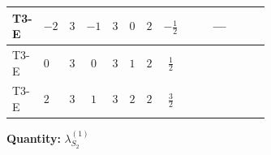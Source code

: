 \documentclass[8pt]{article}
\begin{document}
\begin{landscape}
\begin{longtable}{@{}llcccccc >{\raggedright\arraybackslash}p{0.21\linewidth} >{\raggedright\arraybackslash}p{0.21\linewidth} >{\raggedright\arraybackslash}p{0.21\linewidth}@{}}
\midrule
T3-E & $-2$ & $3$ & $-1$ & $3$ & $0$ & $2$ & $-\frac{1}{2}$ & \scriptsize\adjustbox{max width=\linewidth}{$\begin{gathered} +21 {g_2}^4\end{gathered}$} & --- & \scriptsize\adjustbox{max width=\linewidth}{$\begin{gathered} +{g_2}^2 (-24 {\lambda_{S_2}^{(1)}}-12 {\lambda_{S_2}^{(A)}})\end{gathered}$} \\
\midrule
T3-E & $0$ & $3$ & $0$ & $3$ & $1$ & $2$ & $\frac{1}{2}$ & \scriptsize\adjustbox{max width=\linewidth}{$\begin{gathered} +21 {g_2}^4\end{gathered}$} & \scriptsize\adjustbox{max width=\linewidth}{$\begin{gathered} +{g_1}^2 \left(12 {g_2}^2-12 {\lambda_{S_2}^{(1)}}-6 {\lambda_{S_2}^{(A)}}\right)\end{gathered}$} & \scriptsize\adjustbox{max width=\linewidth}{$\begin{gathered} +{g_2}^2 (-24 {\lambda_{S_2}^{(1)}}-12 {\lambda_{S_2}^{(A)}})\end{gathered}$} \\
\midrule
T3-E & $2$ & $3$ & $1$ & $3$ & $2$ & $2$ & $\frac{3}{2}$ & \scriptsize\adjustbox{max width=\linewidth}{$\begin{gathered} +21 {g_2}^4\end{gathered}$} & \scriptsize\adjustbox{max width=\linewidth}{$\begin{gathered} +{g_1}^2 \left(48 {g_2}^2-48 {\lambda_{S_2}^{(1)}}-24 {\lambda_{S_2}^{(A)}}\right)\end{gathered}$} & \scriptsize\adjustbox{max width=\linewidth}{$\begin{gathered} +{g_2}^2 (-24 {\lambda_{S_2}^{(1)}}-12 {\lambda_{S_2}^{(A)}})\end{gathered}$} \\
\midrule
\bottomrule
\end{longtable}
\clearpage
\noindent\textbf{Quantity: }$\lambda_{S_2}^{(1)}$\par\smallskip

\end{landscape}
\end{document}
